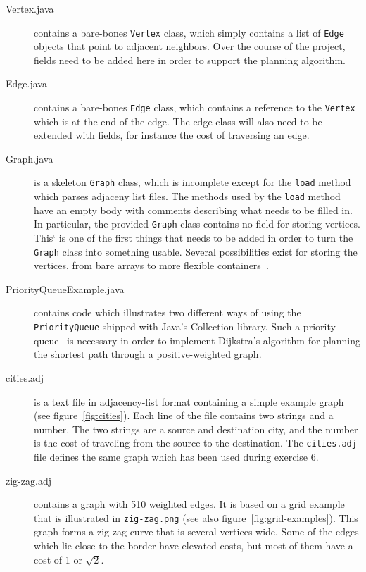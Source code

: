 \documentclass[a4paper,10pt]{article}
\begin{document}
\begin{description}

\item[Vertex.java]
  contains a bare-bones \texttt{Vertex} class, which simply contains a list of \texttt{Edge} objects that point to adjacent neighbors.
  Over the course of the project, fields need to be added here in order to support the planning algorithm.

\item[Edge.java]
  contains a bare-bones \texttt{Edge} class, which contains a reference to the \texttt{Vertex} which is at the end of the edge.
  The edge class will also need to be extended with fields, for instance the cost of traversing an edge.

\item[Graph.java]
  is a skeleton \texttt{Graph} class, which is incomplete except for the \texttt{load} method which parses adjaceny list files.
  The methods used by the \texttt{load} method have an empty body with comments describing what needs to be filled in.
  In particular, the provided \texttt{Graph} class contains no field for storing vertices.
 This` is one of the first things that needs to be added in order to turn the \texttt{Graph} class into something usable.
  Several possibilities exist for storing the vertices, from bare arrays to more flexible containers~\cite{java:linked-list,java:array-list,java:hash-set,java:tree-set,java:hash-map,java:tree-map}.
  
\item[PriorityQueueExample.java]
  contains code which illustrates two different ways of using the \texttt{PriorityQueue} shipped with Java's Collection library.
  Such a priority queue~\cite{wikipedia:priority-queue} is necessary in order to implement Dijkstra's algorithm for planning the shortest path through a positive-weighted graph.
  
\item[cities.adj]
  is a text file in adjacency-list format containing a simple example graph (see figure~\ref{fig:cities}).
  Each line of the file contains two strings and a number.
  The two strings are a source and destination city, and the number is the cost of traveling from the source to the destination.
  The \texttt{cities.adj} file defines the same graph which has been used during exercise 6.
  
\item[zig-zag.adj]
  contains a graph with 510 weighted edges.
  It is based on a grid example that is illustrated in \texttt{zig-zag.png} (see also figure~\ref{fig:grid-examples}).
  This graph forms a zig-zag curve that is several vertices wide.
  Some of the edges which lie close to the border have elevated costs, but most of them have a cost of 1 or $\sqrt{2}$.
  

\end{description}
\end{document}
